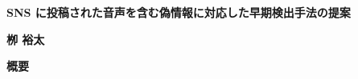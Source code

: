 




\thispagestyle{plain}
\cleardoublepage
%
%

\begin{center}
    \Large
    \textbf{SNS に投稿された音声を含む偽情報に対応した早期検出手法の提案}
        
    \vspace{0.4cm}
    \textbf{栁 裕太}
       
    \vspace{0.9cm}
    \textbf{概要}
   
\end{center}

